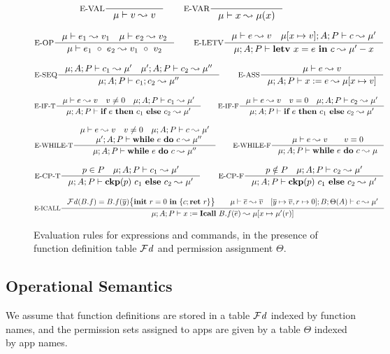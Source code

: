 \begin{figure*}[ht]
{\tiny
\[
\inference[E-VAL]{}{\mu \vdash \leVAL{v}  \leadsto v}
\qquad
\inference[E-VAR]{}{\mu \vdash \leVAR{x}  \leadsto \mu(x)}
\]

\[
\inference[E-OP]{\mu \vdash e_1 \leadsto v_1\quad \mu \vdash e_2 \leadsto v_2}
{\mu \vdash \leOP{e_1}{e_2} \leadsto \leOP{v_1}{v_2}}
\qquad
\inference[E-LETV]{\mu \vdash e \leadsto v \quad \mu [ x \mapsto v ]; A ; P \vdash c \leadsto \mu'}
{\mu; A; P \vdash \lcLETV{x}{e}{c} \leadsto \mu' - x}
\]

\[
\inference[E-SEQ]{\mu;A; P \vdash c_1 \leadsto \mu' \quad \mu';A; P \vdash c_2 \leadsto \mu''}
{\mu;A;P \vdash \lcSEQ{c_1}{c_2} \leadsto \mu''}
\qquad
\inference[E-ASS]{\mu \vdash e \leadsto v}
{\mu; A; P \vdash \lcASS{x}{e} \leadsto \mu [ x \mapsto v ]}
\]

\[
\inference[E-IF-T]{\mu \vdash e \leadsto v\quad v\neq 0\quad \mu; A; P \vdash c_1 \leadsto \mu'}
{\mu; A; P \vdash \lcIF{e}{c_1}{c_2} \leadsto \mu'}
\qquad
\inference[E-IF-F]{\mu \vdash e \leadsto v\quad v = 0\quad \mu;A; P \vdash c_2 \leadsto \mu'}
{\mu;A; P \vdash \lcIF{e}{c_1}{c_2} \leadsto \mu'}
\]

\[
\inference[E-WHILE-T]{
\mu \vdash e \leadsto v\quad v\neq 0\quad
\mu;A; P \vdash c \leadsto \mu'\\
\quad \mu' ; A ; P \vdash \lcWHILE{e}{c} \leadsto \mu''
}
{\mu;A; P \vdash \lcWHILE{e}{c} \leadsto \mu''}
\qquad
\inference[E-WHILE-F]{\mu \vdash e \leadsto v\qquad v = 0}
{\mu;A; P \vdash \lcWHILE{e}{c} \leadsto \mu}
\]

\[
\inference[E-CP-T]{p\in P \quad \mu; A; P \vdash c_1 \leadsto \mu'}
{\mu; A ; P \vdash \lcCP{p}{c_1}{c_2} \leadsto \mu'}
\qquad
\inference[E-CP-F]{p\notin P \quad \mu;A;P \vdash c_2 \leadsto \mu'}
{\mu;A;P \vdash \lcCP{p}{c_1}{c_2} \leadsto \mu'}
\]

\[
\inference[E-ICALL]{
\FD(B.f) = \lpPROG{B.f}{\overline{y}}{c}{\lpRES} \qquad
\mu\vdash\overline{e} \leadsto \overline{v} \quad
[\overline{y} \mapsto \overline{v}, r \mapsto 0] ; B; \Theta(A) \vdash c \leadsto \mu'}
{\mu;A;P \vdash \lcCALL{x}{B.f}{\overline{e}} \leadsto \mu[x \mapsto \mu'(r) ]}
\]
}
\caption{Evaluation rules for expressions and commands, in the presence of function definition table $\mathcal{F}\mathit{d}$ and permission assignment $\Theta.$
}
\label{fig:semantics}
\end{figure*}
 
\subsection{Operational Semantics}\label{sec:semantics}
We assume that function definitions are stored in a table $\mathcal{F}\mathit{d}$ indexed by function names, and the permission sets assigned to apps are given by a table $\Theta$ indexed by app names.

